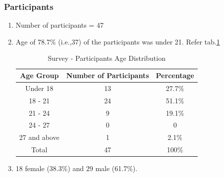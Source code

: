 \documentclass{article}
\begin{document}
\subsubsection{Participants}
\begin{enumerate}
    \item Number of participants = 47
    \item Age of 78.7\% (i.e.,37) of the participants was under 21. Refer tab.\ref{tab:Survey_Participants_Age_Distribution}

    \begin{table}
        \centering
        \begin{tabular}{|c|c|c|}\hline
             Age Group&  Number of Participants& Percentage\\\hline
             Under 18&  13& 27.7\%\\\hline
             18 - 21&  24& 51.1\%\\\hline
             21 - 24&  9& 19.1\%\\\hline
             24 - 27&  0& 0\\\hline
             27 and above&  1& 2.1\%\\ \hline
 Total& 47&100\%\\\hline
        \end{tabular}
        \caption{Survey - Participants Age Distribution}
\label{tab:Survey_Participants_Age_Distribution}
    \end{table}

    \item 18 female (38.3\%) and 29 male (61.7\%).
    
\end{enumerate}
\end{document}
